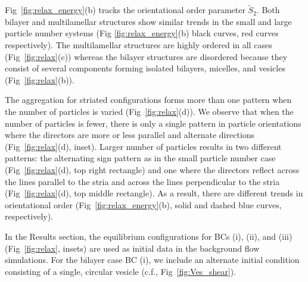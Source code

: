 \documentclass[prb,preprint,showpacs,preprintnumbers,amsmath,amssymb,longbibliography]{revtex4-1}
\begin{document}
Fig~\ref{fig:relax_energy}(b) 
tracks the orientational order parameter $\tilde{S}_2$.
Both bilayer and multilamellar
structures show similar trends in the small and large particle number systems
(Fig \ref{fig:relax_energy}(b) black curves, red curves respectively).
The multilamellar structures are highly ordered in all cases (Fig~\ref{fig:relax}(c))
whereas the bilayer structures
are disordered because they consist of several 
components forming isolated bilayers, micelles, and vesicles (Fig~\ref{fig:relax}(b)).

The aggregation for striated configurations forms more than one 
pattern when the number of particles is varied (Fig~\ref{fig:relax}(d)).
We observe that when the number of particles is fewer, there is only
a single pattern in particle orientations where the directors
are more or less parallel and alternate directions (Fig~\ref{fig:relax}(d), inset).
Larger number of particles results in two different patterns: the alternating sign pattern
as in the small particle number case (Fig~\ref{fig:relax}(d), 
top right rectangle) and one where the directors reflect across the lines parallel
to the stria and across the lines perpendicular to the stria (Fig~\ref{fig:relax}(d),
top middle rectangle).
As a result, there are different trends in orientational order
(Fig~\ref{fig:relax_energy}(b), solid and dashed blue curves, respectively).

In the Results section,
the equilibrium configurations for BCs (i), (ii), and (iii)
(Fig~\ref{fig:relax}, insets) are
used as initial data in the
background flow simulations. 
For the bilayer case BC (i), we include an alternate initial condition 
consisting of a single, circular vesicle (c.f., Fig~\ref{fig:Ves_shear}).


\end{document}
